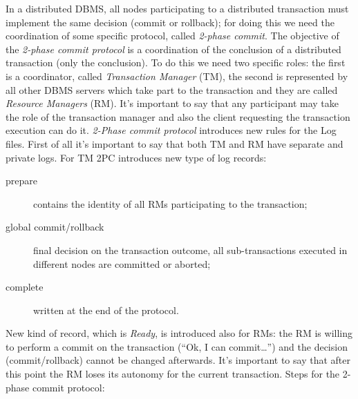 In a distributed DBMS, all nodes participating to a distributed transaction must implement the same decision (commit or rollback); for doing this we need the coordination of some specific protocol, called \emph{2-phase commit}.
The objective of the \emph{2-phase commit protocol} is a coordination of the conclusion of a distributed transaction (only the conclusion).
To do this we need two specific roles: the first is a coordinator, called \emph{Transaction Manager} (TM), the second is represented by all other DBMS servers which take part to the transaction and they are called \emph{Resource Managers} (RM).
It's important to say that any participant may take the role of the transaction manager and also the client requesting the transaction execution can do it.
\emph{2-Phase commit protocol} introduces new rules for the Log files.
First of all it's important to say that both TM and RM have separate and private logs.
For TM 2PC introduces new type of log records:
\begin{description}
	\item[prepare] contains the identity of all RMs participating to the transaction;
	\item[global commit/rollback] final decision on the transaction outcome, all sub-transactions executed in different nodes are committed or aborted;
	\item[complete] written at the end of the protocol.
\end{description}
New kind of record, which is \emph{Ready}, is introduced also for RMs: the RM is willing to perform a commit on the transaction (``Ok, I can commit\ldots'') and the decision (commit/rollback) cannot be changed afterwards.
It's important to say that after this point the RM loses its autonomy for the current transaction.
Steps for the 2-phase commit protocol:
